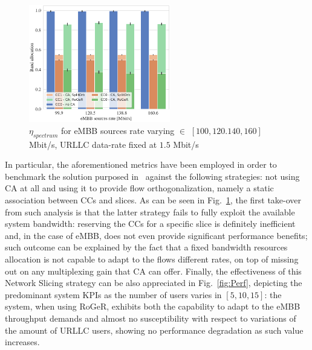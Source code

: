 \documentclass[11pt]{book}
\begin{document}
\begin{figure}
  \begin{center}
    \includegraphics[width=0.55\textwidth]{figures/Band_allocation_eMBB_rate.pdf}
  \end{center}
  \caption{$\eta_{spectrum}$ for eMBB sources rate varying $\in$ $[100, 120. 140, 160]$ Mbit/s, URLLC data-rate fixed at $1.5$ Mbit/s}
  \label{Fig:Band}
\end{figure}
In particular, the aforementioned metrics have been employed in order to benchmark the solution purposed in~\cite{pagin2020} against the following strategies: not using CA at all and using it to provide flow orthogonalization, namely a static association between CCs and slices. As can be seen in Fig.~\ref{Fig:Band}, the first take-over from such analysis is that the latter strategy fails to fully exploit the available system bandwidth: reserving the CCs for a specific slice is definitely inefficient and, in the case of eMBB, does not even provide significant performance benefits; such outcome can be explained by the fact that a fixed bandwidth resources allocation is not capable to adapt to the flows different rates, on top of missing out on any multiplexing gain that CA can offer. Finally, the effectiveness of this Network Slicing strategy can be also appreciated in Fig.~\ref{fig:Perf}, depicting the predominant system KPIs as the number of users varies in $[5, 10, 15]$: the system, when using RoGeR, exhibits both the capability to adapt to the eMBB throughput demands and almost no susceptibility with respect to variations of the amount of URLLC users, showing no performance degradation as such value increases.
\end{document}
